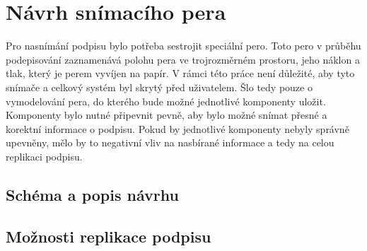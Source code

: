 \chapter{Návrh snímacího pera}
Pro nasnímání podpisu bylo potřeba sestrojit speciální pero.                                        %
Toto pero v průběhu podepisování zaznamenává polohu pera ve trojrozměrném prostoru,                 %
jeho náklon a tlak, který je perem vyvíjen na papír.                                                %
V rámci této práce není důležité, aby tyto snímače a celkový systém byl skrytý před uživatelem.     %
Šlo tedy pouze o vymodelování pera, do kterého bude možné jednotlivé komponenty uložit.             %
Komponenty bylo nutné připevnit pevně, aby bylo možné snímat přesné a korektní informace o podpisu. %
Pokud by jednotlivé komponenty nebyly správně upevněny,                                             %
mělo by to negativní vliv na nasbírané informace a tedy na celou replikaci podpisu.                 %
 
\section{Schéma a popis návrhu}


\section{Možnosti replikace podpisu}



